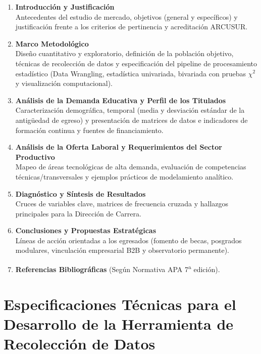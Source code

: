 \documentclass[12pt]{article}
\begin{document}
\begin{enumerate}
    \item \textbf{Introducción y Justificación} \\
    Antecedentes del estudio de mercado, objetivos (general y específicos)
    y justificación frente a los criterios de pertinencia y acreditación
    ARCUSUR.

    \item \textbf{Marco Metodológico} \\
    Diseño cuantitativo y exploratorio, definición de la población
    objetivo, técnicas de recolección de datos y especificación del
    pipeline de procesamiento estadístico (Data Wrangling, estadística
    univariada, bivariada con pruebas $\chi^2$ y visualización
    computacional).

    \item \textbf{Análisis de la Demanda Educativa y Perfil de los
    Titulados} \\
    Caracterización demográfica, temporal (media y desviación estándar de
    la antigüedad de egreso) y presentación de matrices de datos e
    indicadores de formación continua y fuentes de financiamiento.

    \item \textbf{Análisis de la Oferta Laboral y Requerimientos del
    Sector Productivo} \\
    Mapeo de áreas tecnológicas de alta demanda, evaluación de
    competencias técnicas/transversales y ejemplos prácticos de
    modelamiento analítico.

    \item \textbf{Diagnóstico y Síntesis de Resultados} \\
    Cruces de variables clave, matrices de frecuencia cruzada y hallazgos
    principales para la Dirección de Carrera.

    \item \textbf{Conclusiones y Propuestas Estratégicas} \\
    Líneas de acción orientadas a los egresados (fomento de becas,
    posgrados modulares, vinculación empresarial B2B y observatorio
    permanente).

    \item \textbf{Referencias Bibliográficas} (Según Normativa APA 7\textsuperscript{a} edición).
\end{enumerate}

\section{Especificaciones Técnicas para el Desarrollo de la Herramienta de Recolección de Datos}
\end{document}
